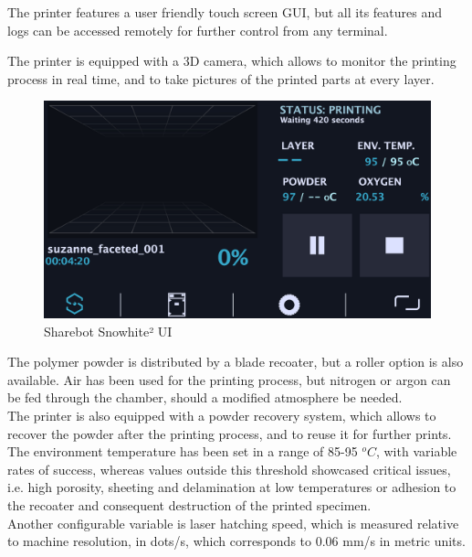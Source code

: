 \documentclass{article}
\begin{document}
        The printer features a user friendly touch screen GUI, but all its features and logs can be accessed remotely for further control from any terminal.  

        The printer is equipped with a 3D camera, which allows to monitor the printing process in real time, 
        and to take pictures of the printed parts at every layer. \\

        \begin{figure}[h!]
            \centering
            \includegraphics[width=\textwidth]{Pictures/sharebot_GUI.eps}
            \caption{Sharebot Snowhite² UI}
            \label{fig:Sharebot_UI}
        \end{figure}

        The polymer powder is distributed by a blade recoater, but a roller option is also available. 
        Air has been used for the printing process, but nitrogen or argon can be fed through the chamber, 
        should a modified atmosphere be needed.  \\

        The printer is also equipped with a powder recovery system, which allows to recover the powder 
        after the printing process, and to reuse it for further prints. \\ 

        The environment temperature has been set in a range of 85-95 $^oC$, with variable rates of success, 
        whereas values outside this threshold showcased critical issues, i.e. high porosity, sheeting and 
        delamination at low temperatures or adhesion to the recoater and consequent destruction of the printed specimen. \\ 

        Another configurable variable is laser hatching speed, which is measured relative to machine resolution, in dots/s, 
        which corresponds to 0.06 mm/s in metric units. 
\end{document}
